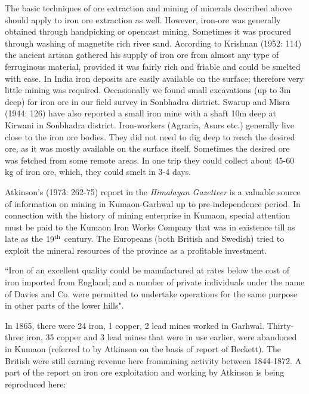 The basic techniques of ore extraction and mining of minerals described above should apply to iron ore extraction as well. However, iron-ore was generally obtained through handpicking or opencast mining. Sometimes it was procured through washing of magnetite rich river sand. According to Krishnan (1952: 114) the ancient artisan gathered his supply of iron ore from almost any type of ferruginous material, provided it was fairly rich and friable and could be smelted with ease. In India iron deposits are easily available on the surface; therefore very little mining was required. Occasionally we found small excavations (up to 3m deep) for iron ore in our field survey in Sonbhadra district. Swarup and Misra (1944: 126) have also reported a small iron mine with a shaft 10m deep at Kirwani in Sonbhadra district. Iron-workers (Agraria, Asurs etc.) generally live close to the iron ore bodies. They did not need to dig deep to reach the desired ore, as it was mostly available on the surface itself. Sometimes the desired ore was fetched from some remote areas. In one trip they could collect about 45-60 kg of iron ore, which, they could smelt in 3-4 days.

Atkinson's (1973: 262-75) report in the {\it Himalayan Gazetteer} is a valuable source of information on mining in Kumaon-Garhwal up to pre-independence period. In connection with the history of mining enterprise in Kumaon, special attention must be paid to the Kumaon Iron Works Company that was in existence till as late as the $19^{\rm th}$ century. The Europeans (both British and Swedish) tried to exploit the mineral resources of the province as a profitable investment.

 ``Iron of an excellent quality could be manufactured at rates below the cost of iron imported from England; and a number of private individuals under the name of Davies and Co. were permitted to undertake operations for the same purpose in other parts of the lower hills". 

In 1865, there were 24 iron, 1 copper, 2 lead mines worked in Garhwal. Thirty-three iron, 35 copper and 3 lead mines that were in use earlier, were abandoned in Kumaon (referred to by Atkinson on the basis of report of Beckett). The British were still earning revenue here from\newpage mining activity between 1844-1872. A part of the report on iron ore exploitation and working by Atkinson is being reproduced here:

